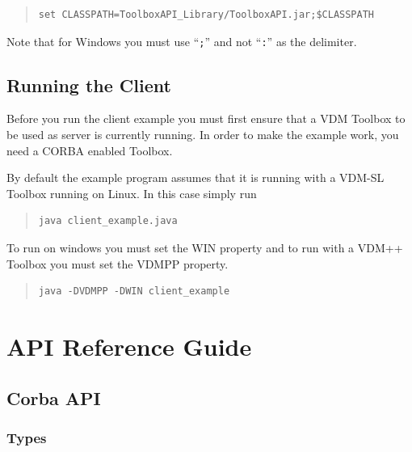 \documentclass[\pformat,12pt]{article}
\begin{document}
\begin{quote}
\begin{verbatim}
set CLASSPATH=ToolboxAPI_Library/ToolboxAPI.jar;$CLASSPATH
\end{verbatim}  %
\end{quote}

Note that for Windows you must use ``{\tt ;}'' and not ``{\tt :}'' as
the delimiter. 

\subsection{Running the Client}

Before you run the client example you must first ensure that a VDM
Toolbox to be used as server is currently running. 
In order to make the example work, you need a CORBA enabled Toolbox.

By default the example program assumes that it is running with a
VDM-SL Toolbox running on Linux.
In this case simply run

\begin{quote}
\begin{verbatim}
java client_example.java
\end{verbatim}  
\end{quote}

To run on windows you must set the WIN property and to run with 
a VDM++ Toolbox you must set the VDMPP property.

\begin{quote}
\begin{verbatim}
java -DVDMPP -DWIN client_example
\end{verbatim}  
\end{quote}

\newpage




\section{API Reference Guide}\label{refguide}

\subsection{Corba API}\label{ref:corbaapi}


\subsubsection{Types}\label{ref:corbatypes}
\end{document}
